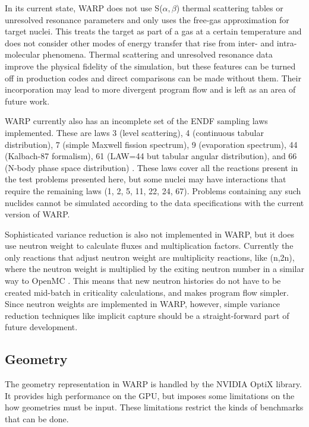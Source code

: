\documentclass[preprint,12pt]{elsarticle}
\begin{document}
In its current state, WARP does not use S($\alpha,$$\beta$) thermal scattering tables or unresolved resonance parameters and only uses the free-gas approximation for target nuclei.  This treats the target as part of a gas at a certain temperature and does not consider other modes of energy transfer that rise from inter- and intra-molecular phenomena.  Thermal scattering and unresolved resonance data improve the physical fidelity of the simulation, but these features can be turned off in production codes and direct comparisons can be made without them.  Their incorporation may lead to more divergent program flow and is left as an area of future work.

WARP currently also has an incomplete set of the ENDF sampling laws implemented.   These are laws 3 (level scattering), 4 (continuous tabular distribution), 7 (simple Maxwell fission spectrum), 9 (evaporation spectrum), 44 (Kalbach-87 formalism), 61 (LAW=44 but tabular angular distribution), and 66 (N-body phase space distribution) \cite{MCNP}.  These laws cover all the reactions present in the test problems presented here, but some nuclei may have interactions that require the remaining laws (1, 2, 5, 11, 22, 24, 67). Problems containing any such nuclides cannot be simulated according to the data specifications with the current version of WARP.

Sophisticated variance reduction is also not implemented in WARP, but it does use neutron weight to calculate fluxes and multiplication factors.  Currently the only reactions that adjust neutron weight are multiplicity reactions, like (n,2n), where the neutron weight is multiplied by the exiting neutron number in a similar way to OpenMC \cite{openmc}.  This means that new neutron histories do not have to be created mid-batch in criticality calculations, and makes program flow simpler.  Since neutron weights are implemented in WARP, however, simple variance reduction techniques like implicit capture should be a straight-forward part of future development.

\subsection{Geometry}

The geometry representation in WARP is handled by the NVIDIA OptiX library.  It provides high performance on the GPU, but imposes some limitations on the how geometries must be input.  These limitations restrict the kinds of benchmarks that can be done.
\end{document}
